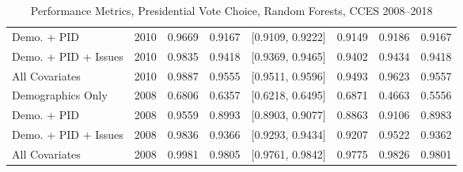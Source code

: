 \begin{table}[H]
\begin{tabular}{lrrrlrrr}
  Demo. + PID & 2010 & 0.9669 & 0.9167 & [0.9109, 0.9222] & 0.9149 & 0.9186 & 0.9167 \\ 
  Demo. + PID + Issues & 2010 & 0.9835 & 0.9418 & [0.9369, 0.9465] & 0.9402 & 0.9434 & 0.9418 \\ 
  All Covariates & 2010 & 0.9887 & 0.9555 & [0.9511, 0.9596] & 0.9493 & 0.9623 & 0.9557 \\ 
  Demographics Only & 2008 & 0.6806 & 0.6357 & [0.6218, 0.6495] & 0.6871 & 0.4663 & 0.5556 \\ 
  Demo. + PID & 2008 & 0.9559 & 0.8993 & [0.8903, 0.9077] & 0.8863 & 0.9106 & 0.8983 \\ 
  Demo. + PID + Issues & 2008 & 0.9836 & 0.9366 & [0.9293, 0.9434] & 0.9207 & 0.9522 & 0.9362 \\ 
  All Covariates & 2008 & 0.9981 & 0.9805 & [0.9761, 0.9842] & 0.9775 & 0.9826 & 0.9801 \\ 
   \bottomrule
\end{tabular}
\caption{Performance Metrics, Presidential Vote Choice, Random Forests, CCES 2008--2018} 
\label{tab:cces_preschoice_rf}
\end{table}
